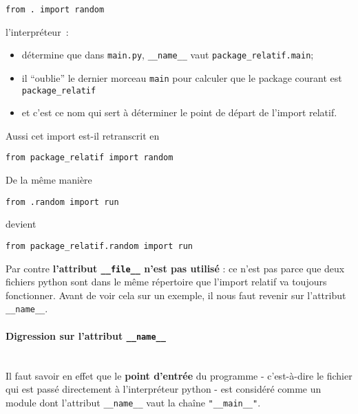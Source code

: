 \begin{verbatim}
from . import random
\end{verbatim}

l'interpréteur~:

\begin{itemize}
	\item 
	détermine que dans \texttt{main.py},
	\texttt{\_\_name\_\_} vaut \texttt{package\_relatif.main};
	\item
	il ``oublie'' le dernier morceau \texttt{main} pour calculer que le package
	courant est \texttt{package\_relatif}
	\item
	et c'est ce nom qui sert à
	déterminer le point de départ de l'import relatif.
\end{itemize}

Aussi cet import est-il retranscrit en

\begin{verbatim}
from package_relatif import random
\end{verbatim}

    De la même manière

\begin{verbatim}
from .random import run
\end{verbatim}

devient

\begin{verbatim}
from package_relatif.random import run
\end{verbatim}

    Par contre \textbf{l'attribut \texttt{\_\_file\_\_} n'est pas utilisé} :
ce n'est pas parce que deux fichiers python sont dans le même répertoire
que l'import relatif va toujours fonctionner. Avant de voir cela sur un
exemple, il nous faut revenir sur l'attribut \texttt{\_\_name\_\_}.

    \hypertarget{digression-sur-lattribut-__name__}{%
\paragraph{\texorpdfstring{Digression sur l'attribut
\texttt{\_\_name\_\_}\\\\}{Digression sur l'attribut \_\_name\_\_}}\label{digression-sur-lattribut-__name__}}

    Il faut savoir en effet que le \textbf{point d'entrée} du programme -
c'est-à-dire le fichier qui est passé directement à l'interpréteur
python - est considéré comme un module dont l'attribut
\texttt{\_\_name\_\_} vaut la chaîne \texttt{"\_\_main\_\_"}.\\

